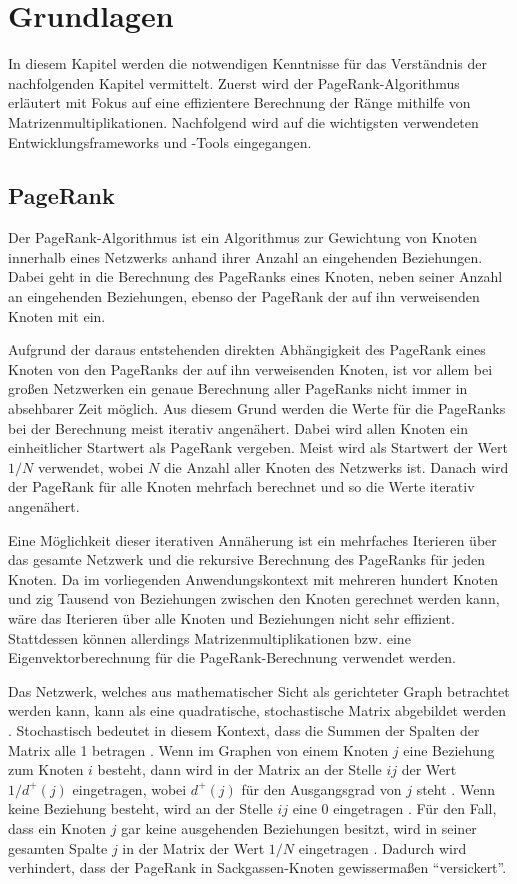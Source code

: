 \section{Grundlagen}\label{sec:07_02_grundlagen}

In diesem Kapitel werden die notwendigen Kenntnisse für das Verständnis der nachfolgenden Kapitel vermittelt. Zuerst wird der PageRank-Algorithmus erläutert mit Fokus auf eine effizientere Berechnung der Ränge mithilfe von Matrizenmultiplikationen. Nachfolgend wird auf die wichtigsten verwendeten Entwicklungsframeworks und -Tools eingegangen.

\subsection{PageRank}
Der PageRank-Algorithmus ist ein Algorithmus zur Gewichtung von Knoten innerhalb eines Netzwerks anhand ihrer Anzahl an eingehenden Beziehungen. Dabei geht in die Berechnung des PageRanks eines Knoten, neben seiner Anzahl an eingehenden Beziehungen, ebenso der PageRank der auf ihn verweisenden Knoten mit ein.

Aufgrund der daraus entstehenden direkten Abhängigkeit des PageRank eines Knoten von den PageRanks der auf ihn verweisenden Knoten, ist vor allem bei großen Netzwerken ein genaue Berechnung aller PageRanks nicht immer in absehbarer Zeit möglich. Aus diesem Grund werden die Werte für die PageRanks bei der Berechnung meist iterativ angenähert. Dabei wird allen Knoten ein einheitlicher Startwert als PageRank vergeben. Meist wird als Startwert der Wert $1/N$ verwendet, wobei $N$ die Anzahl aller Knoten des Netzwerks ist. Danach wird der PageRank für alle Knoten mehrfach berechnet und so die Werte iterativ angenähert.

Eine Möglichkeit dieser iterativen Annäherung ist ein mehrfaches Iterieren über das gesamte Netzwerk und die rekursive Berechnung des PageRanks für jeden Knoten. Da im vorliegenden Anwendungskontext mit mehreren hundert Knoten und zig Tausend von Beziehungen zwischen den Knoten gerechnet werden kann, wäre das Iterieren über alle Knoten und Beziehungen nicht sehr effizient. Stattdessen können allerdings Matrizenmultiplikationen bzw. eine Eigenvektorberechnung für die PageRank-Berechnung verwendet werden.

Das Netzwerk, welches aus mathematischer Sicht als gerichteter Graph betrachtet werden kann, kann als eine quadratische, stochastische Matrix abgebildet werden \cite{pagerank_eigenvector}. Stochastisch bedeutet in diesem Kontext, dass die Summen der Spalten der Matrix alle 1 betragen \cite{pagerank_eigenvector}. Wenn im Graphen von einem Knoten $j$ eine Beziehung  zum Knoten $i$ besteht, dann wird in der Matrix an der Stelle $ij$ der Wert $1/d^{+}(j)$ eingetragen, wobei $d^{+}(j)$ für den Ausgangsgrad von $j$ steht \cite{pagerank_eigenvector}. Wenn keine Beziehung besteht, wird an der Stelle $ij$ eine 0 eingetragen \cite{pagerank_eigenvector}. Für den Fall, dass ein Knoten $j$ gar keine ausgehenden Beziehungen besitzt, wird in seiner gesamten Spalte $j$ in der Matrix der Wert $1/N$ eingetragen \cite{pagerank_eigenvector}. Dadurch wird verhindert, dass der PageRank in Sackgassen-Knoten gewissermaßen ``versickert''.

